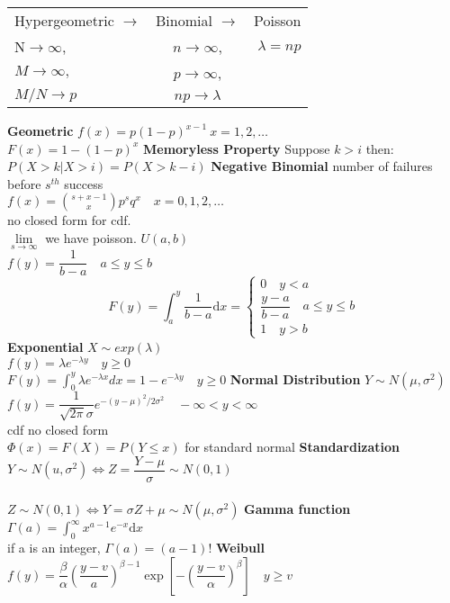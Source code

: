 \documentclass{article}
\newcommand{\dx}{\mathrm{d}x}
\begin{document}
\begin{flushleft}
\begin{tabular}{ l c r }
Hypergeometric $\to$ & Binomial $\to$ & Poisson \\
	N$\to \infty$, & $n\to \infty$, & $\lambda=np$ \\
	$M\to \infty,$ & $p\to \infty$, &  \\
	$M/N \to p$ & $np\to \lambda$ &
\end{tabular}\medbreak
\textbf{Geometric} $f(x)=p(1-p)^{x-1} \ x=1,2,\dots$\\
$F(x)=1-(1-p)^x$\medbreak
\textbf{Memoryless Property} Suppose $k>i$ then:\\
$P(X>k|X>i)=P(X>k-i)$\medbreak
\textbf{Negative Binomial} number of failures before $s^{th}$ success\\
$f(x)={s+x-1 \choose x}p^s q^x \quad x=0,1,2,\dots$\\
no closed form for cdf.\\
$\lim \limits_{s \to \infty}$ we have poisson.\medbreak
{} $U(a,b)$\\
$f(y)=\dfrac{1}{b-a}\quad a\leq y\leq b$
\[F(y)=\int_a^y \dfrac{1}{b-a} \dx = \begin{cases}
0 \quad y<a\\
\dfrac{y-a}{b-a} \quad a\leq y \leq b\\
1 \quad y>b
\end{cases}
\]
\textbf{Exponential} $X \sim exp(\lambda)$\\
$f(y)=\lambda e^{-\lambda y} \quad y\geq 0$\\
$F(y)=\int_{0}^{y}\lambda e^{-\lambda x} dx =1-e^{-\lambda y} \quad y\geq 0$\medbreak
\textbf{Normal Distribution} $Y\sim N(\mu,\sigma^2)$\\
$f(y)=\dfrac{1}{\sqrt{2\pi}\sigma}e^{-(y-\mu)^2/2\sigma^2} \quad -\infty <y< \infty$\\
cdf no closed form\\
 $\Phi(x)=F(X)=P(Y\leq x)$ for standard normal \medbreak
\textbf{Standardization}\\
$Y\sim N(u,\sigma^2)\iff Z=\dfrac{Y-\mu}{\sigma}\sim N(0,1)$\\
\\
$Z\sim N(0,1)\iff Y=\sigma Z+\mu \sim N(\mu,\sigma^2)$\medbreak
\textbf{Gamma function}\\
$\Gamma(a)=\int_{0}^{\infty}x^{a-1}e^{-x}\dx$\\
if a is an integer, $\Gamma(a)=(a-1)!$\medbreak
\textbf{Weibull}\\
$f(y)=\dfrac{\beta}{\alpha}\left(\dfrac{y-v}{a}\right)^{\beta-1} \exp\left[-\left(\dfrac{y-v}{\alpha}\right)^{\beta} \right] \quad y\geq v$\\

\end{flushleft}
\end{document}
